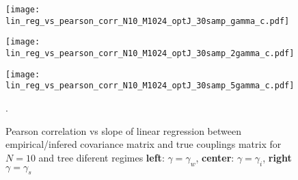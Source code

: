 \documentclass[reprint,amsmath,amssymb,superscriptaddress,showpacs,pre]{revtex4-1}
\begin{document}
\begin{figure*}[!htb]
	\begin{minipage}[b]{0.325\textwidth}
		\begin{center}
			\texttt{[image: lin\_reg\_vs\_pearson\_corr\_N10\_M1024\_optJ\_30samp\_gamma\_c.pdf]}
		\end{center}
	\end{minipage}
	\begin{minipage}[b]{0.325\textwidth}
		\begin{center}
			\texttt{[image: lin\_reg\_vs\_pearson\_corr\_N10\_M1024\_optJ\_30samp\_2gamma\_c.pdf]}
		\end{center}
	\end{minipage}
	\begin{minipage}[b]{0.325\textwidth}
		\begin{center}
			\texttt{[image: lin\_reg\_vs\_pearson\_corr\_N10\_M1024\_optJ\_30samp\_5gamma\_c.pdf]}
		\end{center}
	\end{minipage}
	
	\vspace{-1mm}
	\caption{{   Pearson correlation vs slope of linear regression between empirical/infered covariance matrix and true couplings matrix   for $N=10$ and tree diferent regimes \textbf{left}: $\gamma=\gamma_w$, \textbf{center}: $\gamma=\gamma_i$, \textbf{right} $\gamma=\gamma_s$  }} .
	\label{results_corr_map_C_10_n10}
\end{figure*}
\end{document}
